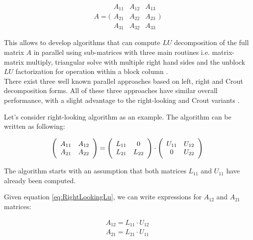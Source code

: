 $$
A = 
\Bigg(\begin{array}{c|c|c}
A_{11} & A_{12} & A_{13} \\ \hline
A_{21} & A_{22} & A_{23} \\ \hline
A_{31} & A_{32} & A_{33}
\end{array}\Bigg)
$$

This allows to develop algorithms that can compute $LU$ decomposition of the full matrix $A$ in parallel using sub-matrices with three main routines i.e. matrix-matrix multiply, triangular solve with multiple right hand sides and the unblock $LU$ factorization for operation within a block column \cite{netlib:lapack-1}.\\

There exist three well known parallel approaches based on left, right and Crout decomposition forms. All of these three approaches have similar overall performance, with a slight advantage to the right-looking and Crout variants \cite{netlib:lapack-1}. 


Let's consider right-looking algorithm as an example. The algorithm can be written as following:

\begin{equation} \label{eq:RightLookingLu}
\Bigg(\begin{array}{c c}
A_{11} & A_{12} \\
A_{21} & A_{22} \\
\end{array}\Bigg)
=
\Bigg(\begin{array}{c c}
L_{11} & 0 \\
L_{21} & L_{22} \\
\end{array}\Bigg)
\cdot
\Bigg(\begin{array}{c c}
U_{11} & U_{12} \\
0 & U_{22} \\
\end{array}\Bigg)
\end{equation}

The algorithm starts with an assumption that both matrices $L_{11}$ and $U_{11}$ have already been computed. 

Given equation \ref{eq:RightLookingLu}, we can write expressions for $A_{12}$ and $A_{21}$ matrices:

\begin{align} \label{eq:RightLookingLuFirstUpdate}
A_{12} = L_{11} \cdot U_{12} \\
A_{21} = L_{21} \cdot U_{11}
\end{align}

